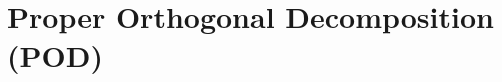 \documentclass[a4paper,10pt]{report}
\begin{document}
% 
% 
% 
% 

\chapter{Proper Orthogonal Decomposition (POD)}
\end{document}
